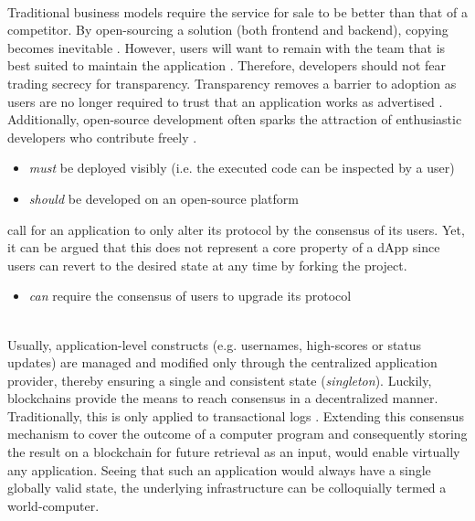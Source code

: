 \begin{description}[format={\storedescriptionlabel}]
	\item[Open-source]
	\hfill \\	
	Traditional business models require the service for sale to be better than that of a competitor. By open-sourcing a solution (both frontend and backend), copying becomes inevitable \cite[p.~10]{Raval.2016}. However, users will want to remain with the team that is best suited to maintain the application \cite[p.~11]{Raval.2016}. Therefore, developers should not fear trading secrecy for transparency. Transparency removes a barrier to adoption as users are no longer required to trust that an application works as advertised \cite[p.~9]{Raval.2016}. Additionally, open-source development often sparks the attraction of enthusiastic developers who contribute freely \cite[p.~11]{Raval.2016}.
	
	\begin{itemize}
  		\item \textit{must} be deployed visibly (i.e. the executed code can be inspected by a user)
  		\item \textit{should} be developed on an open-source platform
	\end{itemize}
	
	\citeauthor{Johnston2015} call for an application to only alter its protocol by the consensus of its users. Yet, it can be argued that this does not represent a core property of a \ac{dApp} since users can revert to the desired state at any time by forking the project.

	\begin{itemize}
  		\item \textit{can} require the consensus of users to upgrade its protocol
	\end{itemize}

	\item[Decentralized \label{decentralizedConsensus} consensus]
	\hfill \\
	Usually, application-level constructs (e.g. usernames, high-scores or status updates) are managed and modified only through the centralized application provider, thereby ensuring a single and consistent state (\textit{singleton}). Luckily, blockchains provide the means to reach consensus in a decentralized manner. Traditionally, this is only applied to transactional logs \cite[p.~1]{bitcoin}. Extending this consensus mechanism to cover the outcome of a computer program and consequently storing the result on a blockchain for future retrieval as an input, would enable virtually any application. Seeing that such an application would always have a single globally valid state, the underlying infrastructure can be colloquially termed a world-computer.
	

\end{description}
